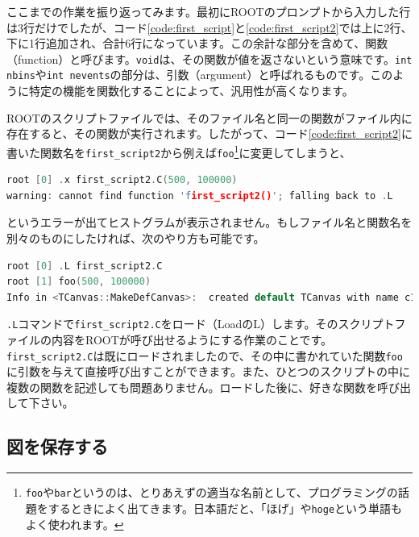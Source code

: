 ここまでの作業を振り返ってみます。最初にROOTのプロンプトから入力した行は3行だけでしたが、コード\ref{code:first_script}と\ref{code:first_script2}では上に2行、下に1行追加され、合計6行になっています。この余計な部分を含めて、関数（function）と呼びます。\texttt{void}は、その関数が値を返さないという意味です。\texttt{int nbins}や\texttt{int nevents}の部分は、引数（argument）と呼ばれるものです。このように特定の機能を関数化することによって、汎用性が高くなります。

ROOTのスクリプトファイルでは、そのファイル名と同一の関数がファイル内に存在すると、その関数が実行されます。したがって、コード\ref{code:first_script2}に書いた関数名を\texttt{first\_script2}から例えば\texttt{foo}\footnote{\texttt{foo}や\texttt{bar}というのは、とりあえずの適当な名前として、プログラミングの話題をするときによく出てきます。日本語だと、「ほげ」や\texttt{hoge}という単語もよく使われます。}に変更してしまうと、
\begin{lstlisting}[language=c++]
root [0] .x first_script2.C(500, 100000)
warning: cannot find function 'first_script2()'; falling back to .L
\end{lstlisting}
というエラーが出てヒストグラムが表示されません。もしファイル名と関数名を別々のものにしたければ、次のやり方も可能です。
\begin{lstlisting}[language=c++]
root [0] .L first_script2.C
root [1] foo(500, 100000)
Info in <TCanvas::MakeDefCanvas>:  created default TCanvas with name c1
\end{lstlisting}
\texttt{.L}コマンドで\texttt{first\_script2.C}をロード（LoadのL）します。そのスクリプトファイルの内容をROOTが呼び出せるようにする作業のことです。\texttt{first\_script2.C}は既にロードされましたので、その中に書かれていた関数\texttt{foo}に引数を与えて直接呼び出すことができます。また、ひとつのスクリプトの中に複数の関数を記述しても問題ありません。ロードした後に、好きな関数を呼び出して下さい。
\subsection{図を保存する}

